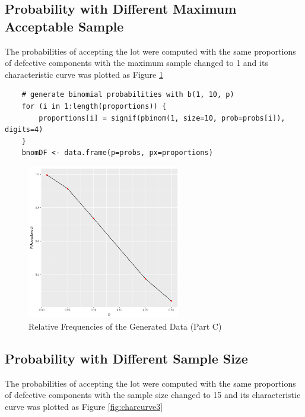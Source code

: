 \documentclass{article}
\begin{document}
        \subsection{Probability with Different Maximum Acceptable Sample}
            The probabilities of accepting the lot were computed with the same proportions of defective components with the maximum sample changed to 1 and its characteristic curve was plotted as Figure \ref{fig:charcurve2}

\begin{lstlisting}
    # generate binomial probabilities with b(1, 10, p)
    for (i in 1:length(proportions)) {
        proportions[i] = signif(pbinom(1, size=10, prob=probs[i]), digits=4)
    }
    bnomDF <- data.frame(p=probs, px=proportions)
\end{lstlisting}

            \begin{figure}[h]
                \begin{center}
                    \includegraphics[width=0.6\textwidth]{figures/charcurve2.png}
                    \caption{Relative Frequencies of the Generated Data (Part C)} \label{fig:charcurve2}
                \end{center}
            \end{figure}

        \subsection{Probability with Different Sample Size}
            The probabilities of accepting the lot were computed with the same proportions of defective components with the sample size changed to 15 and its characteristic curve was plotted as Figure \ref{fig:charcurve3}
\end{document}
